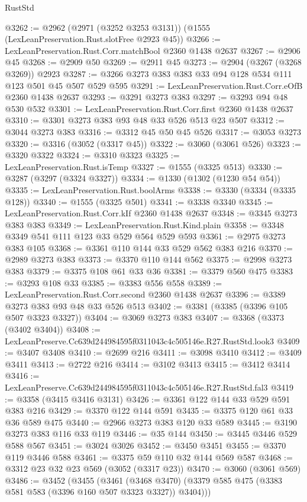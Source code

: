 \begin{lexlean}{RustStd}
\begin{coremodule}
@3262 := @2962 (@2971 (@3252 @3253 @3131)) (@1555 (LexLeanPreservation.Rust.slotFree @2923 @45))
@3266 := LexLeanPreservation.Rust.Corr.matchBool @2360 @1438 @2637
@3267 := @2906 @45
@3268 := @2909 @50
@3269 := @2911 @45
@3273 := @2904 (@3267 (@3268 @3269)) @2923
@3287 := @3266 @3273 @383 @383 @33 @94 @128 @534 @111 @123 @501 @45 @507 @529 @595
@3291 := LexLeanPreservation.Rust.Corr.eOfB @2360 @1438 @2637
@3293 := @3291 @3273 @383
@3297 := @3293 @94 @48 @530 @532
@3301 := LexLeanPreservation.Rust.Corr.first @2360 @1438 @2637
@3310 := @3301 @3273 @383 @93 @48 @33 @526 @513 @23 @507
@3312 := @3044 @3273 @383
@3316 := @3312 @45 @50 @45 @526
@3317 := @3053 @3273
@3320 := @3316 (@3052 (@3317 @45))
@3322 := @3060 (@3061 @526)
@3323 := @3320 @3322
@3324 := @3310 @3323
@3325 := LexLeanPreservation.Rust.isTemp
@3327 := @1555 (@3325 @513)
@3330 := @3287 (@3297 (@3324 @3327))
@3334 := @1330 (@1302 (@1230 @54 @54))
@3335 := LexLeanPreservation.Rust.boolArms
@3338 := @3330 (@3334 (@3335 @128))
@3340 := @1555 (@3325 @501)
@3341 := @3338 @3340
@3345 := LexLeanPreservation.Rust.Corr.kIf @2360 @1438 @2637
@3348 := @3345 @3273 @383 @383
@3349 := LexLeanPreservation.Rust.Kind.plain
@3358 := @3348 @3349 @541 @111 @123 @33 @529 @564 @529 @593
@3361 := @2975 @3273 @383 @105
@3368 := @3361 @110 @144 @33 @529 @562 @383 @216
@3370 := @2989 @3273 @383
@3373 := @3370 @110 @144 @562
@3375 := @2998 @3273 @383
@3379 := @3375 @108 @61 @33 @36
@3381 := @3379 @560 @475
@3383 := @3293 @108 @33
@3385 := @3383 @556 @558
@3389 := LexLeanPreservation.Rust.Corr.second @2360 @1438 @2637
@3396 := @3389 @3273 @383 @93 @48 @33 @526 @513
@3402 := @3381 (@3385 (@3396 @105 @507 @3323 @3327))
@3404 := @3069 @3273 @383
@3407 := @3368 (@3373 (@3402 @3404))
@3408 := LexLeanPreserve.Cc639d244984595f0311043c4c505146e.R27.RustStd.look3
@3409 := @3407 @3408
@3410 := @2699 @216
@3411 := @3098 @3410
@3412 := @3409 @3411
@3413 := @2722 @216
@3414 := @3102 @3413
@3415 := @3412 @3414
@3416 := LexLeanPreserve.Cc639d244984595f0311043c4c505146e.R27.RustStd.fal3
@3419 := @3358 (@3415 @3416 @3131)
@3426 := @3361 @122 @144 @33 @529 @591 @383 @216
@3429 := @3370 @122 @144 @591
@3435 := @3375 @120 @61 @33 @36 @589 @475
@3440 := @2966 @3273 @383 @120 @33 @589
@3445 := @3190 @3273 @383 @116 @33 @119
@3446 := @35 @144
@3450 := @3445 @3446 @529 @588 @567
@3451 := @3024 @3026
@3452 := @3450 @3451
@3455 := @3370 @119 @3446 @588
@3461 := @3375 @59 @110 @32 @144 @569 @587
@3468 := @3312 @23 @32 @23 @569 (@3052 (@3317 @23))
@3470 := @3060 (@3061 @569)
@3486 := @3452
    (@3455
      (@3461 (@3468 @3470) (@3379 @585 @475 (@3383 @581 @583 (@3396 @160 @507 @3323 @3327)) @3404)))

\end{coremodule}
\end{lexlean}
